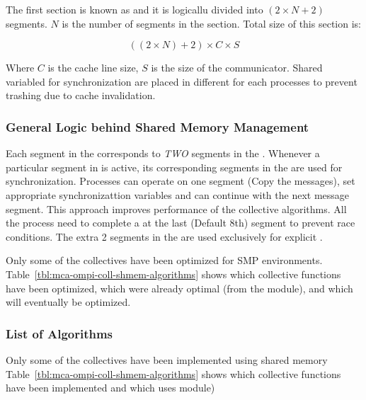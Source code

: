 The first section is known as  and it is
logicallu divided into $(2 \times N + 2)$ segments.  $N$ is the number
of segments in the  section.  Total size of this
section is:

\[
((2 \times N) + 2) \times C \times S 
\]

Where $C$ is the cache line size, $S$ is the size of the communicator.
Shared variabled for synchronization are placed in different
 for each processes to prevent trashing due to cache
invalidation.  


\subsubsection{General Logic behind Shared Memory Management}

Each segment in the  corresponds to {\em TWO}
segments in the .  Whenever a particular segment
in  is active, its corresponding segments in the
 are used for synchronization.  Processes can
operate on one segment (Copy the messages), set appropriate
synchronizattion variables and can continue with the next message
segment.  This approach improves performance of the collective
algorithms. All the process need to complete a 
 at the last (Default 8th) segment to prevent race conditions.  The
 extra 2 segments in the  are used exclusively
 for explicit . 

Only some of the collectives have been optimized for SMP environments.
Table~\ref{tbl:mca-ompi-coll-shmem-algorithms} shows which collective
functions have been optimized, which were already optimal (from the
 module), and which will eventually be optimized.


\subsubsection{List of Algorithms}

Only some of the collectives have been implemented using shared memory
Table~\ref{tbl:mca-ompi-coll-shmem-algorithms} shows which collective
functions have been implemented and which uses 
module)

\def\shmemopt{Implemented using shared memory.}
\def\shmemnoopt{Uses \coll{lam\_\-basic} algorithm.}

